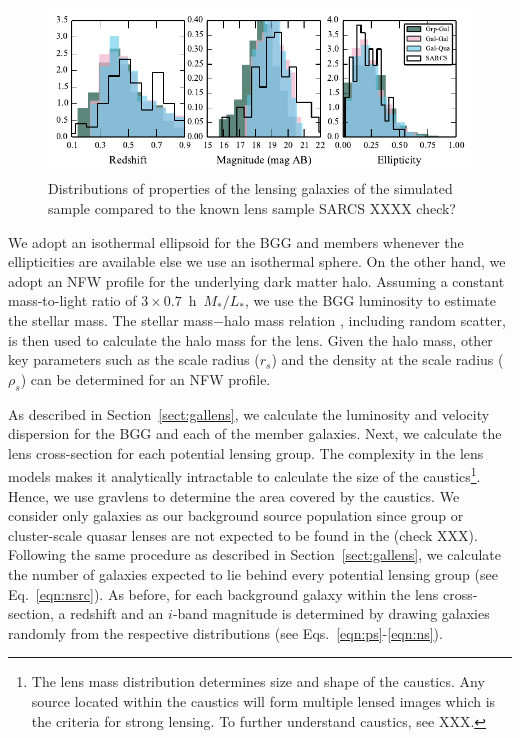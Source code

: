 \documentclass[useAMS,usenatbib,a4paper]{mn2e}
\begin{document}
\begin{figure}
\begin{center}
\includegraphics[scale=1.3]{sw-cfhtls-figs/lensprop.pdf}
\caption{ \label{fig:lensprop}
Distributions of properties of the lensing galaxies of the simulated
sample compared to the known lens sample SARCS XXXX check? 
}
\end{center}
\end{figure}

We adopt an isothermal ellipsoid for the BGG and members whenever the
ellipticities are available else we use an isothermal sphere. On the other hand, we
adopt an NFW profile for the underlying dark matter halo. Assuming a constant
mass-to-light ratio of $3 \times 0.7$~h~$M_{*}/L_{*}$, we use the BGG luminosity
to estimate the stellar mass. The stellar mass$-$halo mass relation
\citep{behroozi13}, including random scatter, is then used to calculate the halo
mass for the lens. Given the halo mass, other key parameters such as the scale
radius ($r_s$) and the density at the scale radius ($\rho_s$) can be determined for an
NFW profile. 

As described in Section~\ref{sect:gallens}, we calculate the luminosity and
velocity dispersion for the BGG and each of the member galaxies. Next, we
calculate the lens cross-section for each potential lensing group. The
complexity in the lens models makes it analytically intractable to calculate the
size of the caustics\footnote{The lens mass distribution determines size and
shape of the caustics. Any source located within the caustics will form multiple
lensed images which is the criteria for strong lensing. To further
understand caustics, see XXX.}.  Hence, we use {\sc
gravlens} to determine the area covered by the caustics. We consider only
galaxies as our background source population since group or cluster-scale quasar
lenses are not expected to be found in the \cfhtls (check XXX).  Following the same
procedure as described in Section~\ref{sect:gallens}, we calculate the number of
galaxies expected to lie behind every potential lensing group (see
Eq.~\ref{eqn:nsrc}). As before, for each background galaxy within the lens cross-section, a
redshift and an $i$-band magnitude is determined by drawing galaxies randomly
from the respective distributions (see Eqs.~\ref{eqn:ps}-\ref{eqn:ns}). 
\end{document}
